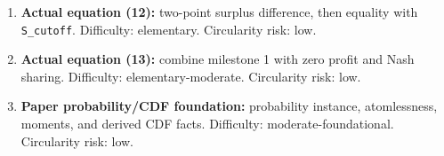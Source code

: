 \documentclass[11pt]{article}
\newcommand{\code}[1]{\nolinkurl{#1}}
\begin{document}
\begin{enumerate}
  \item \textbf{Actual equation (12):} two-point surplus difference, then equality with
  \code{S_cutoff}. Difficulty: elementary. Circularity risk: low.
  \item \textbf{Actual equation (13):} combine milestone 1 with zero profit and Nash
  sharing. Difficulty: elementary-moderate. Circularity risk: low.
  \item \textbf{Paper probability/CDF foundation:} probability instance, atomlessness,
  moments, and derived CDF facts. Difficulty: moderate-foundational. Circularity risk: low.
\end{enumerate}
\end{document}
